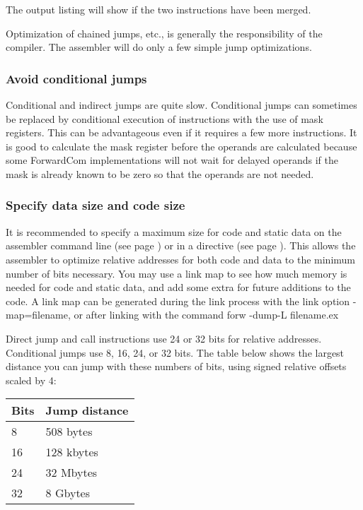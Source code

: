 \documentclass[forwardcom.tex]{subfiles}
\begin{document}
The output listing will show if the two instructions have been merged.
\vv

Optimization of chained jumps, etc., is generally the responsibility of the compiler. The assembler will do only a few simple jump optimizations.
\vv

\subsubsection{Avoid conditional jumps}
Conditional and indirect jumps are quite slow. 
Conditional jumps can sometimes be replaced by conditional execution of instructions with the use of mask registers. This can be advantageous even if it requires a few more instructions. It is good to calculate the mask register before the operands are calculated because some ForwardCom implementations will not wait for delayed operands if the mask is already known to be zero so that the operands are not needed.
\vv

\subsubsection{Specify data size and code size} \label{SpecifyDataSize}
It is recommended to specify a maximum size for code and static data on the assembler command line (see page \pageref{assemblerCommandLine}) 
or in a directive (see page \pageref{optionsDirective}). 
This allows the assembler to optimize relative addresses for both code and data to the minimum number of bits necessary. 
You may use a link map to see how much memory is needed for code and static data, and add some extra for future additions to the code. 
A link map can be generated during the link process with the link option
 {\ttfamily -map=filename}, or after linking with the command {\ttfamily forw -dump-L filename.ex}
\vv

Direct jump and call instructions use 24 or 32 bits for relative addresses. Conditional jumps use 8, 16, 24, or 32 bits. The table below shows the largest distance you can jump with these numbers of bits, using signed relative offsets scaled by 4:
\vv

\begin{tabular}{|p{20mm}|p{140mm}|}
\hline
\bfseries Bits & \bfseries Jump distance \\
\hline
8 & 508 bytes \\
16 & 128 kbytes \\
24 & 32 Mbytes \\
32 & 8 Gbytes \\
\hline
\end{tabular}
\vv
\end{document}
